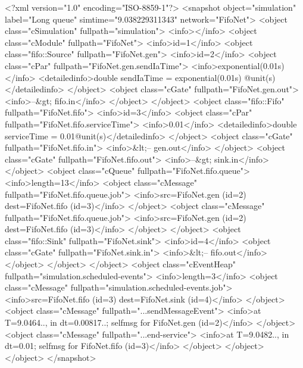 \begin{filelisting}
<?xml version="1.0" encoding="ISO-8859-1"?>
<snapshot object="simulation" label="Long queue" simtime="9.038229311343"
network="FifoNet">
  <object class="cSimulation" fullpath="simulation">
    <info></info>
    <object class="cModule" fullpath="FifoNet">
      <info>id=1</info>
      <object class="fifo::Source" fullpath="FifoNet.gen">
        <info>id=2</info>
        <object class="cPar" fullpath="FifoNet.gen.sendIaTime">
          <info>exponential(0.01s)</info>
          <detailedinfo>double sendIaTime = exponential(0.01s) @unit(s)
          </detailedinfo>
        </object>
        <object class="cGate" fullpath="FifoNet.gen.out">
          <info>--&gt; fifo.in</info>
        </object>
      </object>
      <object class="fifo::Fifo" fullpath="FifoNet.fifo">
        <info>id=3</info>
        <object class="cPar" fullpath="FifoNet.fifo.serviceTime">
          <info>0.01</info>
          <detailedinfo>double serviceTime = 0.01@unit(s)</detailedinfo>
        </object>
        <object class="cGate" fullpath="FifoNet.fifo.in">
          <info>&lt;-- gen.out</info>
        </object>
        <object class="cGate" fullpath="FifoNet.fifo.out">
          <info>--&gt; sink.in</info>
        </object>
        <object class="cQueue" fullpath="FifoNet.fifo.queue">
          <info>length=13</info>
          <object class="cMessage" fullpath="FifoNet.fifo.queue.job">
            <info>src=FifoNet.gen (id=2)  dest=FifoNet.fifo (id=3)</info>
          </object>
          <object class="cMessage" fullpath="FifoNet.fifo.queue.job">
            <info>src=FifoNet.gen (id=2)  dest=FifoNet.fifo (id=3)</info>
          </object>
        </object>
      <object class="fifo::Sink" fullpath="FifoNet.sink">
        <info>id=4</info>
        <object class="cGate" fullpath="FifoNet.sink.in">
          <info>&lt;-- fifo.out</info>
        </object>
      </object>
    </object>
    <object class="cEventHeap" fullpath="simulation.scheduled-events">
      <info>length=3</info>
      <object class="cMessage" fullpath="simulation.scheduled-events.job">
        <info>src=FifoNet.fifo (id=3)  dest=FifoNet.sink (id=4)</info>
      </object>
      <object class="cMessage" fullpath="...sendMessageEvent">
        <info>at T=9.0464.., in dt=0.00817..; selfmsg for FifoNet.gen (id=2)</info>
      </object>
      <object class="cMessage" fullpath="...end-service">
        <info>at T=9.0482.., in dt=0.01; selfmsg for FifoNet.fifo (id=3)</info>
      </object>
    </object>
  </object>
</snapshot>

\end{filelisting}



